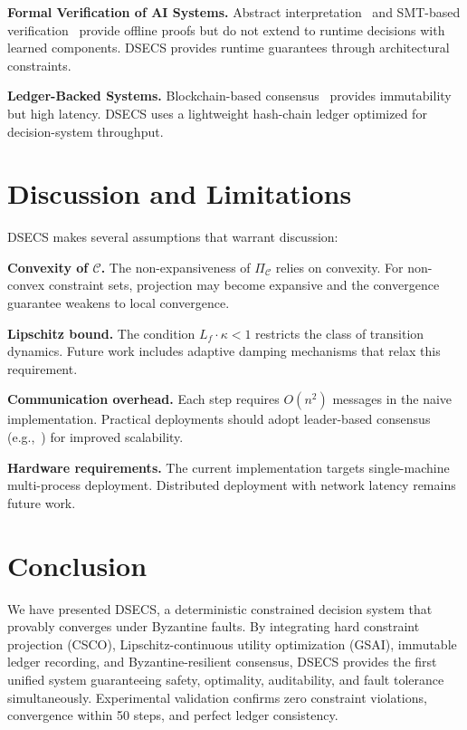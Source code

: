 \documentclass[11pt,letterpaper]{article}
\newcommand{\cC}{\mathcal{C}}
\begin{document}
\textbf{Formal Verification of AI Systems.}
Abstract interpretation~\cite{cousot1977abstract} and SMT-based
verification~\cite{gehr2018ai2} provide offline proofs but do not
extend to runtime decisions with learned components. DSECS provides
runtime guarantees through architectural constraints.

\textbf{Ledger-Backed Systems.}
Blockchain-based consensus~\cite{nakamoto2008bitcoin} provides
immutability but high latency. DSECS uses a lightweight hash-chain
ledger optimized for decision-system throughput.

\section{Discussion and Limitations}

DSECS makes several assumptions that warrant discussion:

\textbf{Convexity of $\cC$.}
The non-expansiveness of $\Pi_{\cC}$ relies on convexity. For
non-convex constraint sets, projection may become expansive and the
convergence guarantee weakens to local convergence.

\textbf{Lipschitz bound.}
The condition $L_f \cdot \kappa < 1$ restricts the class of transition
dynamics. Future work includes adaptive damping mechanisms that
relax this requirement.

\textbf{Communication overhead.}
Each step requires $O(n^2)$ messages in the naive implementation.
Practical deployments should adopt leader-based consensus
(e.g.,~\cite{yin2019hotstuff}) for improved scalability.

\textbf{Hardware requirements.}
The current implementation targets single-machine multi-process
deployment. Distributed deployment with network latency remains
future work.

\section{Conclusion}

We have presented DSECS, a deterministic constrained decision system
that provably converges under Byzantine faults. By integrating hard
constraint projection (CSCO), Lipschitz-continuous utility optimization
(GSAI), immutable ledger recording, and Byzantine-resilient consensus,
DSECS provides the first unified system guaranteeing safety, optimality,
auditability, and fault tolerance simultaneously. Experimental
validation confirms zero constraint violations, convergence within
50 steps, and perfect ledger consistency.
\end{document}
